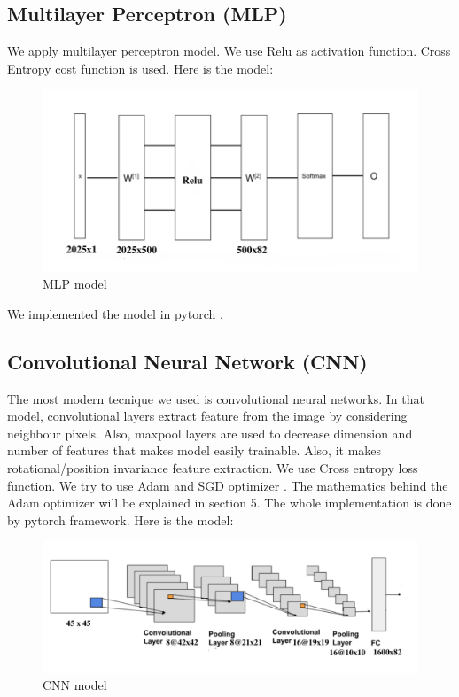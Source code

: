 \documentclass[10pt]{article}
\begin{document}
\subsection{Multilayer Perceptron (MLP)}
We apply multilayer perceptron model. We use Relu as activation function. Cross Entropy cost function is used. Here is the model:
\begin{figure}[h]
\centering
\includegraphics[scale=0.5]{MLP}
\caption{MLP model}
\end{figure}
We implemented the model in pytorch \cite{pytorch}.
\subsection{Convolutional Neural Network (CNN)}
The most modern tecnique we used is convolutional neural networks. In that model, convolutional layers extract feature from the image by considering neighbour pixels. Also, maxpool layers are used to decrease dimension and number of features that makes model easily trainable. Also, it makes rotational/position invariance feature extraction. We use Cross entropy loss function. We try to use Adam and SGD optimizer . The mathematics behind the Adam optimizer will be explained in section 5. The whole implementation is done by pytorch \cite{pytorch} framework. Here is the model:
\begin{figure}[h]
\centering
\includegraphics[scale=0.5]{CNN}
\caption{CNN model}
\end{figure} 
\end{document}
